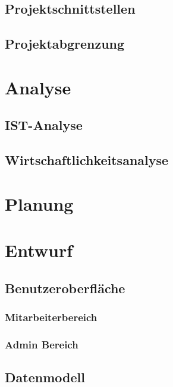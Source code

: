 \documentclass{article}
\begin{document}
\subsection{Projektschnittstellen}

\subsection{Projektabgrenzung}

\section{Analyse}

\subsection{IST-Analyse}

\subsection{Wirtschaftlichkeitsanalyse}

\section{Planung}

\section{Entwurf}

\subsection{Benutzeroberfläche}

\subsubsection{Mitarbeiterbereich}

\subsubsection{Admin Bereich}

\subsection{Datenmodell}
\end{document}
